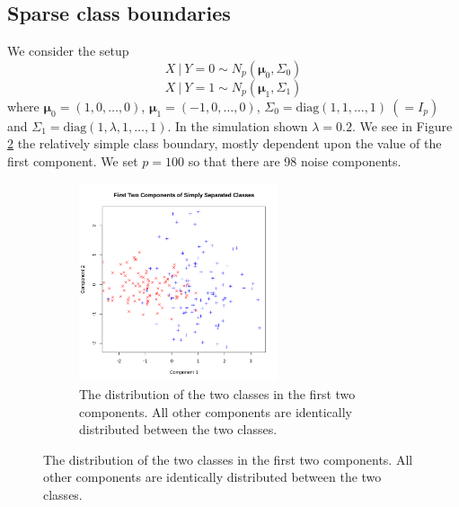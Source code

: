 \documentclass[12pt]{article}
\begin{document}
\subsection{Sparse class boundaries}
We consider the setup
$$X\ | \ Y = 0 \sim N_p(\mathbf{\mu}_0, \Sigma_0) $$
$$X\ | \ Y= 1 \sim N_p(\mathbf{\mu}_1, \Sigma_1) $$
where $\mathbf{\mu}_0 = (1, 0, \dots, 0)$, $\mathbf{\mu}_1 = (-1, 0, \dots, 0)$, $\Sigma_0 = \mathrm{diag}(1, 1, \dots, 1) \ (= I_p)$ and $\Sigma_1 = \mathrm{diag}(1, \lambda, 1, \dots, 1)$. In the simulation shown $\lambda = 0.2$. We see in Figure \ref{fig:simpleboundary} the relatively simple class boundary, mostly dependent upon the value of the first component. We set $p = 100$ so that there are 98 noise components.


\begin{figure}[t!]
    \centering
    \begin{subfigure}[t]{0.45\textwidth}
        \centering
        \includegraphics[height=2.3in]{figures/simpleboundary.png}
        \caption{The distribution of the two classes in the first two components. All other components are identically distributed between the two classes.\label{fig:simpleboundary}}
    \end{subfigure}%
    

\end{figure}
\end{document}
